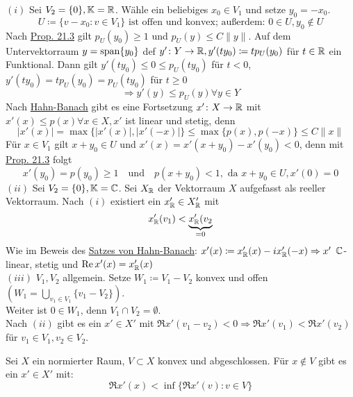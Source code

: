 \begin{beweis}
	$(i)$ Sei $V_{2} = \{ 0 \}, \mathbb{K} = \mathbb{R}$. Wähle ein beliebiges $x_{0} \in V_{1}$ und setze $y_{0} = - x_{0}$. 
	\[ U \coloneqq \{ v - x_{0} : v \in V_{1} \} \text{ ist offen und konvex; außerdem: } 0 \in U, y_{0} \notin U \]
	Nach \hyperref[prop:21.3]{Prop. 21.3} gilt $p_{U}(y_{0}) \geq 1$ und $p_{U}(y) \leq C \| y \|$. Auf dem Untervektorraum $y = \operatorname{span} \{ y_{0} \}$ def $y' \colon Y \rightarrow \mathbb{R}, y'(t y_{0}) \coloneqq t p_{U}(y_{0})$ für $t \in \mathbb{R}$ ein Funktional. Dann gilt $y'(t y_{0}) \leq 0 \leq p_{U}(t y_{0})$ für $t < 0$, $y'(t y_{0}) = t p_{U}(y_{0}) = p_{U}(t y_{0})$ für $t \geq 0$ 
	\[ \Rightarrow y'(y) \leq p_{U}(y) \forall y \in Y \]
	Nach \hyperref[satz:20.3-HahnBanach]{Hahn-Banach} gibt es eine Fortsetzung $x' \colon X \rightarrow \mathbb{R}$ mit $x'(x) \leq p(x) \forall x \in X, x'$ ist linear und stetig, denn 
	\[ |x'(x)| = \max \{ | x'(x) | , | x'(-x) | \} \leq \max \{ p(x) , p(-x) \} \leq C \| x \| \]
	Für $x \in V_{1}$ gilt $x + y_{0} \in U$ und $x'(x) = x'(x + y_{0}) - x'(y_{0}) < 0$, denn mit \hyperref[prop:21.3]{Prop. 21.3} folgt
	\[ x'(y_{0}) = p(y_{0}) \geq 1 \quad \text{und} \quad  p(x + y_{0}) < 1, \text{ da } x + y_{0} \in U, x'(0) = 0 \]
	$(ii)$ Sei $V_{2} = \{ 0 \}, \mathbb{K} = \mathbb{C}$. Sei $X_{\mathbb{R}}$ der Vektorraum $X$ aufgefasst als reeller Vektorraum. Nach $(i)$ existiert ein $x'_{\mathbb{R}} \in X'_{\mathbb{R}}$ mit 
	\[ x'_{\mathbb{R}}(v_{1}) < \underbrace{x'_{\mathbb{R}}(v_{2}}_{= 0}  \]
	Wie im Beweis des \hyperref[satz:20.3-Hahn-Banach]{Satzes von Hahn-Banach}: $x'(x) \coloneqq x'_{\mathbb{R}}(x) - i x'_{\mathbb{R}}(-x) \Rightarrow x'$ $\mathbb{C}$-linear, stetig und $\mathop{\rm Re}\nolimits x'(x) = x'_{\mathbb{R}}(x)$ \\
	$(iii)$ $V_{1}, V_{2}$ allgemein. Setze $W_{1} \coloneqq V_{1} - V_{2}$ konvex und offen $\left( W_{1} = \bigcup_{v_{1} \in V_{1}} \{ v_{1} - V_{2} \} \right)$.  \\
	Weiter ist $0 \in W_{1}$, denn $V_{1} \cap V_{2} = \emptyset$. \\
	Nach $(ii)$ gibt es ein $x' \in X'$ mit $\Re x'(v_{1} - v_{2}) < 0 \Rightarrow \Re x'(v_{1}) < \Re x'(v_{2})$ für $v_{1} \in V_{1}, v_{2} \in V_{2}$.
\end{beweis}


\begin{satz}[2. Trennungssatz]
	Sei $X$ ein normierter Raum, $V \subset X$ konvex und abgeschlossen. Für $x \notin V$ gibt es ein $x' \in X'$ mit:
		\[ \Re x'(x) < \inf \{ \Re x'(v) : v \in V \} \]	
\end{satz}


\newpage